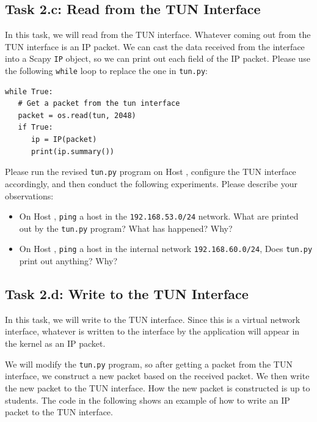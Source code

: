\subsection{Task 2.c: Read from the TUN Interface}


In this task, we will read from the TUN interface. Whatever coming out from the TUN interface 
is an IP packet. We can cast the data received from the interface into a Scapy \texttt{IP} 
object, so we can print out each field of the IP packet. Please use the 
following \texttt{while} loop to replace the one in \texttt{tun.py}:  

\begin{lstlisting}
while True:
   # Get a packet from the tun interface
   packet = os.read(tun, 2048)
   if True:
      ip = IP(packet)
      print(ip.summary())
\end{lstlisting}


Please run the revised \texttt{tun.py} program on Host \hostu, configure the 
TUN interface accordingly, and then 
conduct the following experiments. Please 
describe your observations: 


\begin{itemize}
\item On Host \hostu, \texttt{ping} a host in the \texttt{192.168.53.0/24} network. 
What are printed out by the \texttt{tun.py} program? What has happened? Why?   

\item On Host \hostu,  \texttt{ping} a host in the internal network \texttt{192.168.60.0/24}, 
Does \texttt{tun.py} print out anything? Why?   
\end{itemize}
 



\subsection{Task 2.d: Write to the TUN Interface} 


In this task, we will write to the TUN interface. Since this is a virtual network 
interface, whatever is written to the interface by the application will
appear in the kernel as an IP packet.


We will modify the \texttt{tun.py} program, so after getting a packet from the TUN interface, 
we construct a new packet based 
on the received packet. We then write the new packet to the TUN interface.
How the new packet is constructed is up to students. The code in the following
shows an example of how to write an IP packet to the TUN interface. 


